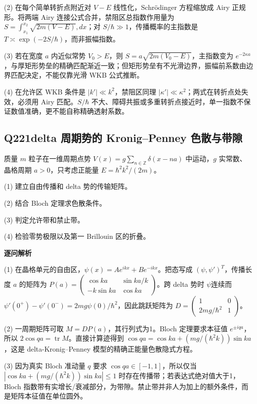 (2) 在每个简单转折点附近对 $V-E$ 线性化，Schrödinger 方程缩放成 Airy 正规形。将两端 Airy 连接公式合并，禁阻区总指数作用量为 $S=\int_{x_1}^{x_2}\sqrt{2m(V-E)},dx$；对 $S/\hbar\gg1$，传播概率的主指数是 $T\asymp\exp(-2S/\hbar)$，而非振幅指数。

(3) 若在宽度 $a$ 内近似常势 $V_0>E$，则 $S=a\sqrt{2m(V_0-E)}$，主指数变为 $e^{-2\kappa a}$，与厚矩形势垒的精确匹配渐近一致；但矩形势垒有不光滑边界，振幅前系数由边界匹配决定，不能仅靠光滑 WKB 公式推断。

(4) 在允许区 WKB 条件是 $|k'|\ll k^2$，禁阻区同理 $|\kappa'|\ll\kappa^2$；两式在转折点处失效，必须用 Airy 匹配。$S/\hbar$ 不大、障碍共振或多重转折点接近时，单一指数不保证数值准确，更不能自称精确透射系数。

\par\medskip

\subsection*{Q221\quad delta 周期势的 Kronig–Penney 色散与带隙}

质量 $m$ 粒子在一维周期点势 $V(x)=g\sum_{n\in\mathbb Z}\delta(x-na)$ 中运动，$g$ 实常数、晶格周期 $a>0$，只考虑正能量 $E=\hbar^2k^2/(2m)$。

(1) 建立自由传播和 delta 势的传输矩阵。

(2) 结合 Bloch 定理求色散条件。

(3) 判定允许带和禁止带。

(4) 检验零势极限以及第一 Brillouin 区的折叠。

\par\textbf{逐问解析}

(1) 在晶格单元的自由区，$\psi(x)=Ae^{ikx}+Be^{-ikx}$。把态写成 $(\psi,\psi')^T$，传播长度 $a$ 的矩阵为 $P(a)=\begin{pmatrix}\cos ka&\sin ka/k\\-k\sin ka&\cos ka\end{pmatrix}$。跨 delta 势时 $\psi$连续而 $\psi'(0^+)-\psi'(0^-)=2mg\psi(0)/\hbar^2$，因此跳跃矩阵为 $D=\begin{pmatrix}1&0\\2mg/\hbar^2&1\end{pmatrix}$。

(2) 一周期矩阵可取 $M=DP(a)$，其行列式为1。Bloch 定理要求本征值 $e^{\pm iqa}$，所以 $2\cos qa=\operatorname{tr}M$。直接计算迹得到 $\cos qa=\cos ka+(mg/(\hbar^2k))\sin ka$，这是 delta-Kronig–Penney 模型的精确正能量色散隐式方程。

(3) 因为真实 Bloch 准动量 $q$ 要求 $\cos qa\in[-1,1]$，所以仅当 $|\cos ka+(mg/(\hbar^2k))\sin ka|\le1$ 时存在传播带；若表达式绝对值大于1，Bloch 指数带有实增长/衰减部分，为带隙。禁止带并非人为加上的额外条件，而是矩阵本征值在单位圆外。

